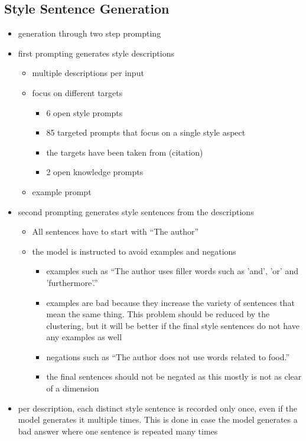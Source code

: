 \subsection{Style Sentence Generation}

\begin{itemize}
  \item generation through two step prompting
  \item first prompting generates style descriptions
        \begin{itemize}
          \item multiple descriptions per input
          \item focus on different targets
                \begin{itemize}
                  \item 6 open style prompts
                  \item 85 targeted prompts that focus on a single style aspect
                  \item the targets have been taken from (citation)
                  \item 2 open knowledge prompts
                \end{itemize}
          \item example prompt
        \end{itemize}
  \item second prompting generates style sentences from the descriptions
        \begin{itemize}
          \item All sentences have to start with \enquote{The author}
          \item the model is instructed to avoid examples and negations
                \begin{itemize}
                  \item examples such as \enquote{The author uses filler words such as 'and', 'or' and 'furthermore'.} %
                  \item examples are bad because they increase the variety of sentences that mean the same thing. This problem should be reduced by the clustering, but it will be better if the final style sentences do not have any examples as well
                  \item negations such as \enquote{The author does not use words related to food.}
                  \item the final sentences should not be negated as this mostly is not as clear of a dimension
                \end{itemize}
        \end{itemize}
  \item per description, each distinct style sentence is recorded only once, even if the model generates it multiple times. This is done in case the model generates a bad answer where one sentence is repeated many times
\end{itemize}